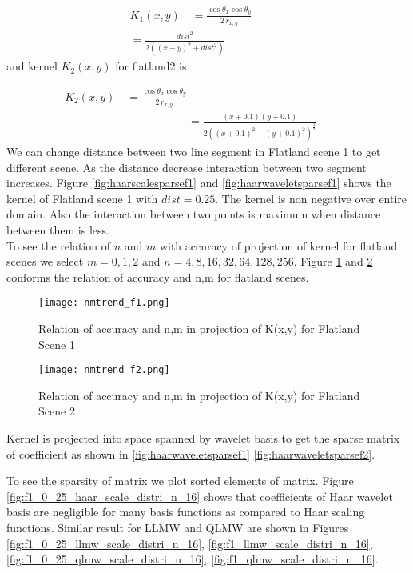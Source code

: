 \begin{eqnarray} \label{eq:kernelflatland1}
K_1(x,y)\quad=\frac{   \cos{\theta_x}  \cos{\theta_y}  }{    2\,r_{x,y}   }\quad\quad\quad\\
        =\frac{dist^2}{2((x-y)^2+dist^2)}
\end{eqnarray}
and kernel  $K_2(x,y)$ for flatland2 is

\begin{eqnarray} \label{eq:kernelflatland2}
K_2(x,y)\quad=\frac{\cos{\theta_x}\cos{\theta_y}}{2\,r_{x,y}} \quad\quad\quad\quad\quad\quad\quad\quad\quad\quad\\
\quad\quad\quad\quad\quad\quad\quad\quad\quad\quad\quad=\frac{(x+0.1)(y+0.1)}{2((x+0.1)^2+(y+0.1)^2)^{\frac{3}{2}}}\quad\quad\quad
\end{eqnarray}
We can change distance between two line segment in Flatland scene 1 to get different scene. As the distance decrease interaction between two segment increases. Figure \ref{fig:haarscalesparsef1} and \ref{fig:haarwaveletsparsef1} shows the kernel of Flatland scene 1 with $dist=0.25$. The kernel is non negative over entire domain. Also the interaction between two points is maximum when distance between them is less. \\

To see the relation of $n$ and $m$ with accuracy of projection of kernel for flatland scenes we select $m = 0,1,2$ and $n=4,8,16,32,64,128,256$. Figure  \ref{fig:nmtrend_f1} and \ref{fig:nmtrend_f2} conforms the relation of accuracy and n,m for flatland scenes.


\begin{figure}[tbh]
\centering{}
\captionsetup{justification=centering}
\texttt{[image: nmtrend\_f1.png]}
\caption{\label{fig:nmtrend_f1}Relation of accuracy and n,m in projection of K(x,y) for Flatland Scene 1}
\end{figure}
\begin{figure}[tbh]
\centering{}
\captionsetup{justification=centering}
\texttt{[image: nmtrend\_f2.png]}
\caption{\label{fig:nmtrend_f2}Relation of accuracy and n,m in projection of K(x,y) for Flatland Scene 2}
\end{figure}


Kernel is projected into space spanned by wavelet basis to get the sparse matrix of coefficient as shown in \ref{fig:haarwaveletsparsef1} \ref{fig:haarwaveletsparsef2}.




To see the sparsity of matrix we plot sorted elements of matrix. Figure \ref{fig:f1_0_25_haar_scale_distri_n_16} shows that coefficients of Haar wavelet basis are negligible for many basis functions as compared to Haar scaling functions. Similar result for LLMW and QLMW are shown in Figures \ref{fig:f1_0_25_llmw_scale_distri_n_16}, \ref{fig:f1_llmw_scale_distri_n_16}, \ref{fig:f1_0_25_qlmw_scale_distri_n_16}, \ref{fig:f1_qlmw_scale_distri_n_16}.

